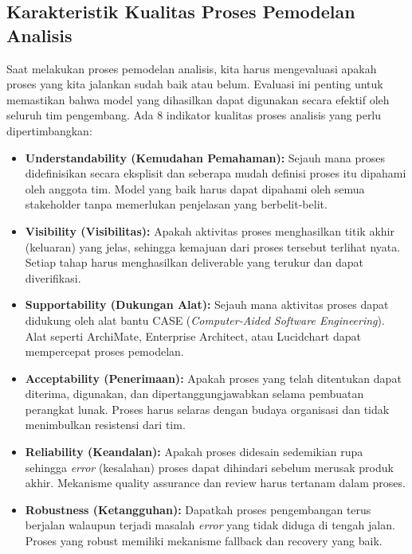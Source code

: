 \documentclass[12pt,a4paper]{article}
\begin{document}
\subsection{Karakteristik Kualitas Proses Pemodelan Analisis}

Saat melakukan proses pemodelan analisis, kita harus mengevaluasi apakah proses yang kita jalankan sudah baik atau belum. Evaluasi ini penting untuk memastikan bahwa model yang dihasilkan dapat digunakan secara efektif oleh seluruh tim pengembang. Ada 8 indikator kualitas proses analisis yang perlu dipertimbangkan:

\begin{itemize}
    \item \textbf{Understandability (Kemudahan Pemahaman):} Sejauh mana proses didefinisikan secara eksplisit dan seberapa mudah definisi proses itu dipahami oleh anggota tim. Model yang baik harus dapat dipahami oleh semua stakeholder tanpa memerlukan penjelasan yang berbelit-belit.
    
    \item \textbf{Visibility (Visibilitas):} Apakah aktivitas proses menghasilkan titik akhir (keluaran) yang jelas, sehingga kemajuan dari proses tersebut terlihat nyata. Setiap tahap harus menghasilkan deliverable yang terukur dan dapat diverifikasi.
    
    \item \textbf{Supportability (Dukungan Alat):} Sejauh mana aktivitas proses dapat didukung oleh alat bantu CASE (\textit{Computer-Aided Software Engineering}). Alat seperti ArchiMate, Enterprise Architect, atau Lucidchart dapat mempercepat proses pemodelan.
    
    \item \textbf{Acceptability (Penerimaan):} Apakah proses yang telah ditentukan dapat diterima, digunakan, dan dipertanggungjawabkan selama pembuatan perangkat lunak. Proses harus selaras dengan budaya organisasi dan tidak menimbulkan resistensi dari tim.
    
    \item \textbf{Reliability (Keandalan):} Apakah proses didesain sedemikian rupa sehingga \textit{error} (kesalahan) proses dapat dihindari sebelum merusak produk akhir. Mekanisme quality assurance dan review harus tertanam dalam proses.
    
    \item \textbf{Robustness (Ketangguhan):} Dapatkah proses pengembangan terus berjalan walaupun terjadi masalah \textit{error} yang tidak diduga di tengah jalan. Proses yang robust memiliki mekanisme fallback dan recovery yang baik.
    

\end{itemize}
\end{document}
